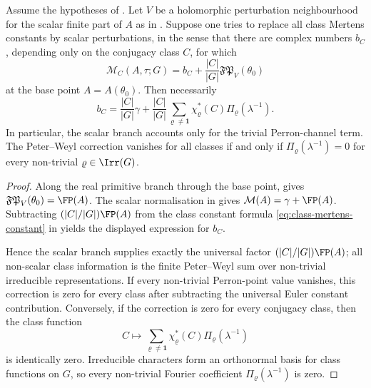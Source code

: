 \begin{proposition}
  \label{prop:scalar-boundary-no-class-correction}
  Assume the hypotheses of .  Let \(V\) be a
  holomorphic perturbation neighbourhood for the scalar finite part of \(A\) as
  in .  Suppose one tries to replace
  all class Mertens constants by scalar perturbations, in the sense that there
  are complex numbers \(b_C\), depending only on the conjugacy class \(C\), for
  which
  \[
    \mathcal M_C(A,\tau;G)=b_C+\frac{|C|}{|G|}\mathfrak{FP}_{V}(\theta_0)
  \]
  at the base point \(A=A(\theta_0)\).  Then necessarily
  \[
    b_C=\frac{|C|}{|G|}\gamma
      +\frac{|C|}{|G|}
        \sum_{\varrho\ne\mathbf1}
          \chi_\varrho^\ast(C)\Pi_\varrho(\lambda^{-1}).
  \]
  In particular, the scalar branch accounts only for the trivial Perron-channel
  term.  The Peter--Weyl correction vanishes for all classes if and only if
  \(\Pi_\varrho(\lambda^{-1})=0\) for every non-trivial
  \(\varrho\in\Irr(G)\).
\end{proposition}

\begin{proof}
  Along the real primitive branch through the base point,
   gives
  \(\mathfrak{FP}_{V}(\theta_0)=\FP(A)\).  The scalar normalisation in
   gives
  \(\mathcal M(A)=\gamma+\FP(A)\).  Subtracting
  \((|C|/|G|)\FP(A)\) from the class constant formula
  \eqref{eq:class-mertens-constant} in  yields
  the displayed expression for \(b_C\).

  Hence the scalar branch supplies exactly the universal factor
  \((|C|/|G|)\FP(A)\); all non-scalar class information is the finite
  Peter--Weyl sum over non-trivial irreducible representations.  If every
  non-trivial Perron-point value vanishes, this correction is zero for every
  class after subtracting the universal Euler constant contribution.  Conversely,
  if the correction is zero for every conjugacy class, then the class function
  \[
    C\longmapsto
    \sum_{\varrho\ne\mathbf1}
      \chi_\varrho^\ast(C)\Pi_\varrho(\lambda^{-1})
  \]
  is identically zero.  Irreducible characters form an orthonormal basis for
  class functions on \(G\), so every non-trivial Fourier coefficient
  \(\Pi_\varrho(\lambda^{-1})\) is zero.
\end{proof}

